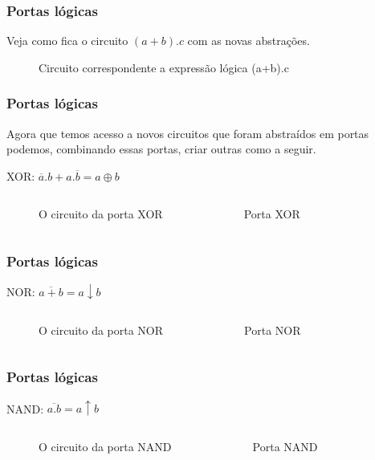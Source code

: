 \begin{frame}
	\frametitle{Portas lógicas}
	\par Veja como fica o circuito $(a+b).c$ com as novas abstrações.
	\begin{figure}
		\centering
		
		\caption{Circuito correspondente a expressão lógica (a+b).c}
		\label{fig:circuitoAndOr}
	\end{figure}
\end{frame}

\begin{frame}
	\frametitle{Portas lógicas}
	\par Agora que temos acesso a novos circuitos que foram abstraídos em portas podemos, combinando essas portas, criar outras como a seguir.
	\par XOR: $\boxed{\overline{a}.b+a.\overline{b} = a \oplus b}$
	\begin{columns}
			\begin{figure}
				\centering
				
				\caption{O circuito da porta XOR}
				\label{fig:cicuitoxor}
			\end{figure}
			\begin{figure}
				\centering
				
				\caption{Porta XOR}
				\label{fig:cicuitoxorabstrato}
			\end{figure}
	\end{columns}
\end{frame}

\begin{frame}
	\frametitle{Portas lógicas}
	\par NOR: $\boxed{\overline{a+b} = a \downarrow b}$
	\begin{columns}
		\column{0.5\textwidth}
		\begin{figure}
			\centering
			
			\caption{O circuito da porta NOR}
			\label{fig:cicuitonor}
		\end{figure}
		\column{0.5\textwidth}
		\begin{figure}
			\centering
			
			\caption{Porta NOR}
			\label{fig:cicuitonorabstrato}
		\end{figure}
	\end{columns}
\end{frame}

\begin{frame}
	\frametitle{Portas lógicas}
	\par NAND: $\boxed{\overline{a.b} = a \uparrow b}$
	\begin{columns}
		\begin{figure}
			\centering
			
			\caption{O circuito da porta NAND}
			\label{fig:cicuitonand}
		\end{figure}
		\begin{figure}
			\centering
			
			\caption{Porta NAND}
			\label{fig:cicuitonandabstrato}
		\end{figure}
	\end{columns}
\end{frame}

